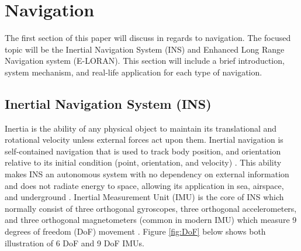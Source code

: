 \newpage
\setcounter{page}{1}
\justifying
\noindent

\section{Navigation}
The first section of this paper will discuss in regards to navigation. The focused topic will be the Inertial Navigation System (INS) and Enhanced Long Range Navigation system (E-LORAN). This section will include a brief introduction, system mechanism, and real-life application for each type of navigation.\\

\subsection{Inertial Navigation System (INS)}
Inertia is the ability of any physical object to maintain its translational and rotational velocity unless external forces act upon them. Inertial navigation is self-contained navigation that is used to track body position, and orientation relative to its initial condition (point, orientation, and velocity) \cite{Woodman2007NumberNavigation}\cite{Ribbens2003AircraftInstruments}. This ability makes INS an autonomous system with no dependency on external information and does not radiate energy to space, allowing its application in sea, airspace, and underground \cite{2018MiniatureUnit}. Inertial Measurement Unit (IMU) is the core of INS which normally consist of three orthogonal gyroscopes, three orthogonal accelerometers, and three orthogonal magnetometers (common in modern IMU) which measure 9 degrees of freedom (DoF) movement \cite{Christ2014NavigationalSensors}. Figure \ref{fig:DoF} below shows both illustration of 6 DoF and 9 DoF IMUs.\\


